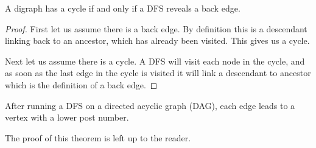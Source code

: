 \begin{theorem}
A digraph has a cycle if and only if a DFS reveals a back edge.
\end{theorem}

\begin{proof}

First let us assume there is a back edge.  By definition this is a
descendant linking back to an ancestor, which has already been
visited.  This gives us a cycle.

Next let us assume there is a cycle.  A DFS will visit each node in
the cycle, and as soon as the last edge in the cycle is visited it
will link a descendant to ancestor which is the definition of a back
edge.

\end{proof}

\begin{theorem}

After running a DFS on a directed acyclic graph (DAG), each edge leads
to a vertex with a lower post number.

\end{theorem}

The proof of this theorem is left up to the reader.
